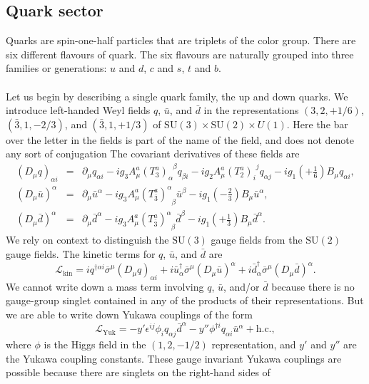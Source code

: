 \subsection{Quark sector}
Quarks are spin-one-half particles that are triplets of the color group. There are six different flavours of quark. The six flavours are naturally grouped into three families or generations: $u$ and $d$, $c$ and $s$, $t$ and $b$.
\\ \\
Let us begin by describing a single quark family, the up and down quarks. We introduce left-handed Weyl fields $q$, $\bar{u}$, and $\bar{d}$ in the representations
$(3,2,+{1}/{6})$, $(\bar{3},1,-{2}/{3})$, and $(\bar{3},1,+{1}/{3})$ of $\mathrm{SU}(3) \times \mathrm{SU}(2) \times U(1)$. 
Here the bar over the letter in the fields is part of the name of the field, and does not denote any sort of conjugation
The covariant derivatives of these fields are
\begin{eqnarray}
(D_{\mu}q)_{\alpha i} &=& \partial_{\mu}q_{\alpha i} - ig_3A^a_{\mu}(T^a_3)_{\alpha}^{\phantom{\alpha}\beta} q_{\beta i} - ig_2A^a_{\mu}(T^a_2)_{i}^{\phantom{j}j} q_{\alpha j} - ig_1(+\frac{1}{6})B_{\mu} q_{\alpha i}
,\nonumber \\
(D_{\mu}\bar{u})^{\alpha} &=& \partial_{\mu}\bar{u}^{\alpha} -ig_3A^a_{\mu}(T^a_{\bar{3}})^{\alpha}_{\phantom{\alpha}\beta} \bar{u}^{\beta } - ig_1(-\frac{2}{3})B_{\mu}\bar{u}^{\alpha}
,\nonumber \\
(D_{\mu}\bar{d})^{\alpha} &=& \partial_{\mu}\bar{d}^{\alpha} -ig_3A^a_{\mu}(T^a_{\bar{3}})^{\alpha}_{\phantom{\alpha}\beta} \bar{d}^{\beta } - ig_1(+\frac{1}{3})B_{\mu}\bar{d}^{\alpha}
.\nonumber
\end{eqnarray}
We rely on context to distinguish the $\mathrm{SU}(3)$ gauge fields from the $\mathrm{SU}(2)$ gauge fields. The kinetic terms for $q$, $\bar{u}$, and $\bar{d}$ are
\[\mathcal{L}_{\mathrm{kin}} = iq^{\dagger \alpha i} \overline{\sigma}^{\mu} (D_{\mu}q)_{\alpha i} + i\bar{u}^{\dagger}_{\alpha}\overline{\sigma}^{\mu}(D_{\mu}\bar{u})^{\alpha} + i\bar{d}^{\dagger}_{\alpha}\overline{\sigma}^{\mu}(D_{\mu}\bar{d})^{\alpha}.\]
We cannot write down a mass term involving $q$, $\bar{u}$, and/or $\bar{d}$ because there is no gauge-group singlet contained in any of the products of their representations. But we are able to write down Yukawa couplings of the form
\[\mathcal{L}_{\mathrm{Yuk}} = -y'\epsilon^{ij}\phi_i q_{\alpha j} \bar{d}^{\alpha} - y'' \phi^{\dagger i}q_{\alpha i} \bar{u}^{\alpha} + \mathrm{h.c.},\]
where $\phi$ is the Higgs field in the $(1,2,-{1}/{2})$ representation, and $y'$ and $y''$ are the Yukawa coupling constants. These gauge invariant Yukawa couplings are possible because there are singlets on the right-hand sides of
